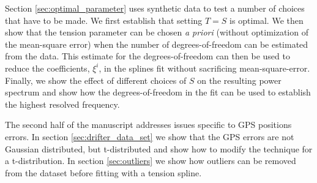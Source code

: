 \documentclass[10pt,journal]{IEEEtran}
\begin{document}
Section \ref{sec:optimal_parameter} uses synthetic data to test a number of choices that have to be made. We first establish that setting $T=S$ is optimal. We then show that the tension parameter can be chosen \emph{a priori} (without optimization of the mean-square error) when the number of degrees-of-freedom can be estimated from the data. This estimate for the degrees-of-freedom can then be used to reduce the coefficients, $\xi^i$, in the splines fit without sacrificing mean-square-error. Finally, we show the effect of different choices of $S$ on the resulting power spectrum and show how the degrees-of-freedom in the fit can be used to establish the highest resolved frequency.

The second half of the manuscript addresses issues specific to GPS positions errors. In section \ref{sec:drifter_data_set} we show that the GPS errors are not Gaussian distributed, but t-distributed and show how to modify the technique for a t-distribution. In section \ref{sec:outliers} we show how outliers can be removed from the dataset before fitting with a tension spline.





\end{document}
